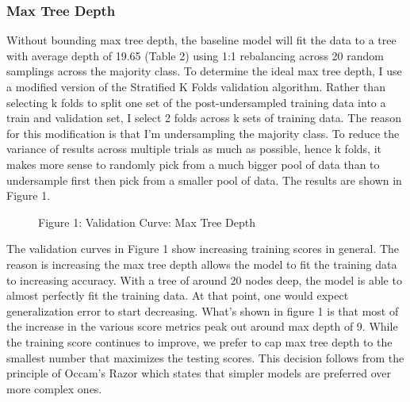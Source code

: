 \documentclass{article}
\begin{document}
\subsubsection*{Max Tree Depth}
Without bounding max tree depth, the baseline model will fit the data to a tree with average depth of 19.65 (Table 2) using 1:1 rebalancing across 20 random samplings across the majority class. To determine the ideal max tree depth, I use a modified version of the Stratified K Folds validation algorithm. Rather than selecting k folds to split one set of the post-undersampled training data into a train and validation set, I select 2 folds across k sets of training data. The reason for this modification is that I'm undersampling the majority class. To reduce the variance of results across multiple trials as much as possible, hence k folds, it makes more sense to randomly pick from a much bigger pool of data than to undersample first then pick from a smaller pool of data. The results are shown in Figure 1.

\begin{figure}
	\centering
	Figure 1: Validation Curve: Max Tree Depth
\end{figure}

The validation curves in Figure 1 show increasing training scores in general. The reason is increasing the max tree depth allows the model to fit the training data to increasing accuracy. With a tree of around 20 nodes deep, the model is able to almost perfectly fit the training data. At that point, one would expect generalization error to start decreasing. What's shown in figure 1 is that most of the increase in the various score metrics peak out around max depth of 9. While the training score continues to improve, we prefer to cap max tree depth to the smallest number that maximizes the testing scores. This decision follows from the principle of Occam's Razor which states that simpler models are preferred over more complex ones. 
\end{document}
